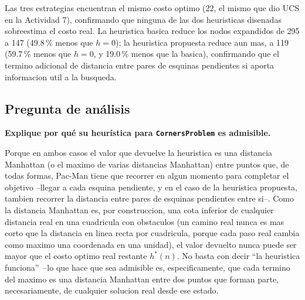 Las tres estrategias encuentran el mismo costo optimo (22, el mismo que dio UCS en la Actividad
7), confirmando que ninguna de las dos heuristicas disenadas sobreestima el costo real. La
heuristica basica reduce los nodos expandidos de 295 a 147 (49.8\,\% menos que $h=0$); la
heuristica propuesta reduce aun mas, a 119 (59.7\,\% menos que $h=0$, y 19.0\,\% menos que la
basica), confirmando que el termino adicional de distancia entre pares de esquinas pendientes si
aporta informacion util a la busqueda.

\subsection{Pregunta de análisis}

\textbf{Explique por qué su heurística para \texttt{CornersProblem} es admisible.}

Porque en ambos casos el valor que devuelve la heuristica es una distancia Manhattan (o el maximo
de varias distancias Manhattan) entre puntos que, de todas formas, Pac-Man tiene que recorrer en
algun momento para completar el objetivo --llegar a cada esquina pendiente, y en el caso de la
heuristica propuesta, tambien recorrer la distancia entre pares de esquinas pendientes entre si--.
Como la distancia Manhattan es, por construccion, una cota inferior de cualquier distancia real
en una cuadricula con obstaculos (un camino real nunca es mas corto que la distancia en linea
recta por cuadricula, porque cada paso real cambia como maximo una coordenada en una unidad), el
valor devuelto nunca puede ser mayor que el costo optimo real restante $h^*(n)$. No basta con decir
``la heuristica funciona''\ --lo que hace que sea admisible es, especificamente, que cada termino
del maximo es una distancia Manhattan entre dos puntos que forman parte, necesariamente, de
cualquier solucion real desde ese estado.
